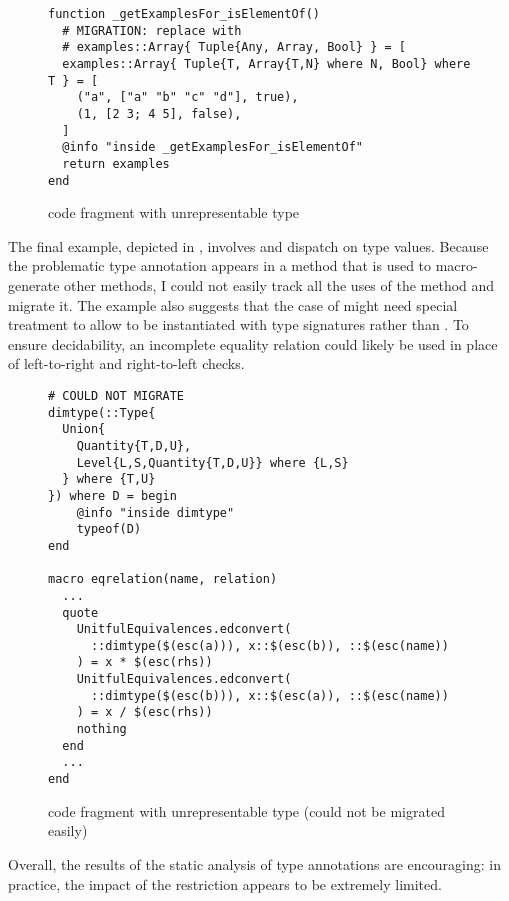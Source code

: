 \begin{figure}
\begin{minipage}{12cm}
\begin{lstlisting}
function _getExamplesFor_isElementOf()
  # MIGRATION: replace with
  # examples::Array{ Tuple{Any, Array, Bool} } = [
  examples::Array{ Tuple{T, Array{T,N} where N, Bool} where T } = [
    ("a", ["a" "b" "c" "d"], true),
    (1, [2 3; 4 5], false),
  ]
  @info "inside _getExamplesFor_isElementOf"
  return examples
end
\end{lstlisting}
\end{minipage}
\caption{ code fragment with unrepresentable type
}\label{fig:evaluation-migrate-alicorn}
\end{figure}

The final example, depicted in , 
involves  and dispatch on type values.
Because the problematic type annotation appears in a method that is used
to macro-generate other methods, I could not easily
track all the uses of the method and migrate it.
The example also suggests that the case of  might need
special treatment to allow  to be instantiated with type signatures
\tysig rather than \ty. To ensure decidability, an incomplete equality
relation could likely be used in place of left-to-right and right-to-left
checks.

\begin{figure}
\begin{minipage}{12cm}
\begin{lstlisting}
# COULD NOT MIGRATE
dimtype(::Type{
  Union{
    Quantity{T,D,U}, 
    Level{L,S,Quantity{T,D,U}} where {L,S}
  } where {T,U}
}) where D = begin
	@info "inside dimtype"
	typeof(D)
end

macro eqrelation(name, relation)
  ...
  quote
    UnitfulEquivalences.edconvert(
      ::dimtype($(esc(a))), x::$(esc(b)), ::$(esc(name))
    ) = x * $(esc(rhs))
    UnitfulEquivalences.edconvert(
      ::dimtype($(esc(b))), x::$(esc(a)), ::$(esc(name))
    ) = x / $(esc(rhs))
    nothing
  end
  ...
end

\end{lstlisting}
\end{minipage}
\caption{ code fragment with unrepresentable type
(could not be migrated easily)
}\label{fig:evaluation-migrate-unitful}
\end{figure}

Overall, the results of the static analysis of type annotations
are encouraging: in practice, the impact of the restriction appears to be
extremely limited.
